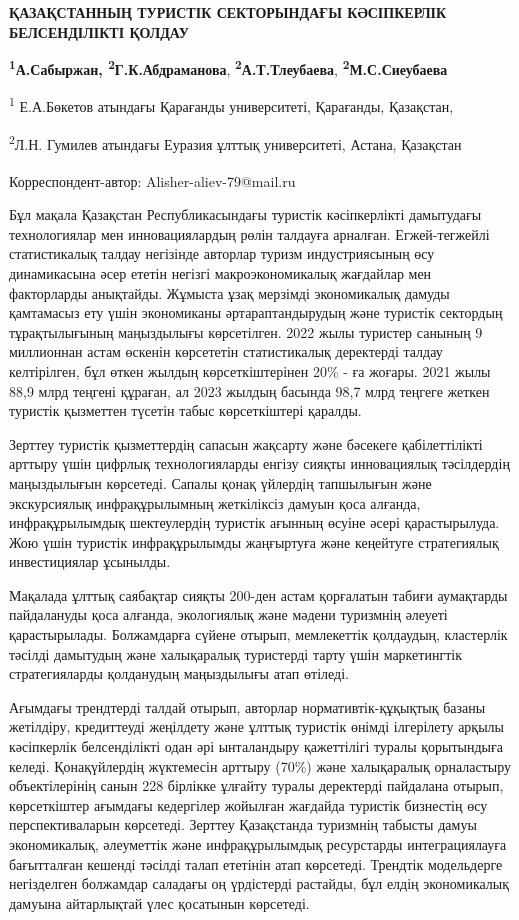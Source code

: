 


{\bfseries ҚАЗАҚСТАННЫҢ ТУРИСТІК СЕКТОРЫНДАҒЫ КӘСІПКЕРЛІК БЕЛСЕНДІЛІКТІ
ҚОЛДАУ}

{\bfseries \textsuperscript{1}А.Сабыржан\textsuperscript{\envelope },
\textsuperscript{2}Г.К.Абдраманова},
{\bfseries \textsuperscript{2}А.Т.Тлеубаева},
{\bfseries \textsuperscript{2}М.С.Сиеубаева}

\textsuperscript{1} Е.А.Бөкетов атындағы Қарағанды университеті,
Қарағанды, Қазақстан,

\textsuperscript{2}Л.Н. Гумилев атындағы Еуразия ұлттық университеті,
Астана, Қазақстан

{\bfseries \textsuperscript{\envelope }}Корреспондент-автор:
Alisher-aliev-79@mail.ru

Бұл мақала Қазақстан Республикасындағы туристік кәсіпкерлікті дамытудағы
технологиялар мен инновациялардың рөлін талдауға арналған.
Егжей-тегжейлі статистикалық талдау негізінде авторлар туризм
индустриясының өсу динамикасына әсер ететін негізгі макроэкономикалық
жағдайлар мен факторларды анықтайды. Жұмыста ұзақ мерзімді экономикалық
дамуды қамтамасыз ету үшін экономиканы әртараптандырудың және туристік
сектордың тұрақтылығының маңыздылығы көрсетілген. 2022 жылы туристер
санының 9 миллионнан астам өскенін көрсететін статистикалық деректерді
талдау келтірілген, бұл өткен жылдың көрсеткіштерінен 20\% - ға жоғары.
2021 жылы 88,9 млрд теңгені құраған, ал 2023 жылдың басында 98,7 млрд
теңгеге жеткен туристік қызметтен түсетін табыс көрсеткіштері қаралды.

Зерттеу туристік қызметтердің сапасын жақсарту және бәсекеге
қабілеттілікті арттыру үшін цифрлық технологияларды енгізу сияқты
инновациялық тәсілдердің маңыздылығын көрсетеді. Сапалы қонақ үйлердің
тапшылығын және экскурсиялық инфрақұрылымның жеткіліксіз дамуын қоса
алғанда, инфрақұрылымдық шектеулердің туристік ағынның өсуіне әсері
қарастырылуда. Жою үшін туристік инфрақұрылымды жаңғыртуға және
кеңейтуге стратегиялық инвестициялар ұсынылды.

Мақалада ұлттық саябақтар сияқты 200-ден астам қорғалатын табиғи
аумақтарды пайдалануды қоса алғанда, экологиялық және мәдени туризмнің
әлеуеті қарастырылады. Болжамдарға сүйене отырып, мемлекеттік қолдаудың,
кластерлік тәсілді дамытудың және халықаралық туристерді тарту үшін
маркетингтік стратегияларды қолданудың маңыздылығы атап өтіледі.

Ағымдағы трендтерді талдай отырып, авторлар нормативтік-құқықтық базаны
жетілдіру, кредиттеуді жеңілдету және ұлттық туристік өнімді ілгерілету
арқылы кәсіпкерлік белсенділікті одан әрі ынталандыру қажеттілігі туралы
қорытындыға келеді. Қонақүйлердің жүктемесін арттыру (70\%) және
халықаралық орналастыру объектілерінің санын 228 бірлікке ұлғайту туралы
деректерді пайдалана отырып, көрсеткіштер ағымдағы кедергілер жойылған
жағдайда туристік бизнестің өсу перспективаларын көрсетеді. Зерттеу
Қазақстанда туризмнің табысты дамуы экономикалық, әлеуметтік және
инфрақұрылымдық ресурстарды интеграциялауға бағытталған кешенді тәсілді
талап ететінін атап көрсетеді. Трендтік модельдерге негізделген
болжамдар саладағы оң үрдістерді растайды, бұл елдің экономикалық
дамуына айтарлықтай үлес қосатынын көрсетеді.

